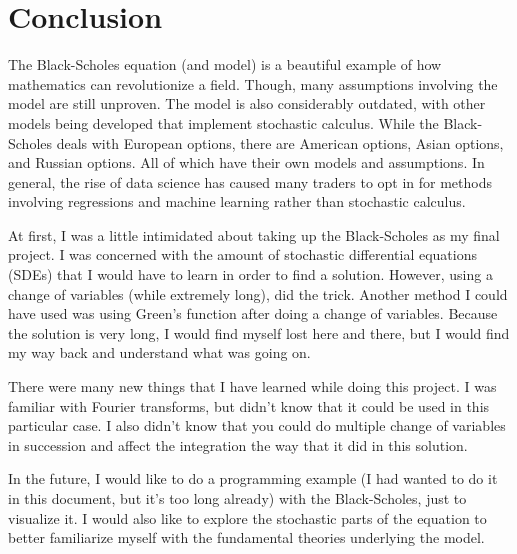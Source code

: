 \documentclass{article}
\begin{document}


\section*{Conclusion}

The Black-Scholes equation (and model) is a beautiful example of how mathematics can revolutionize a field. 
Though, many assumptions involving the model are still unproven. The model is also considerably outdated, with other models being developed that implement stochastic calculus. While the Black-Scholes deals with European options, there are American options, Asian options, and Russian options. All of which have their own models and assumptions. In general, the rise of data science has caused many traders to opt in for methods involving regressions and machine learning rather than stochastic calculus.

At first, I was a little intimidated about taking up the Black-Scholes as my final project. I was concerned with the amount of stochastic differential equations (SDEs) that I would have to learn in order to find a solution. However, using a change of variables (while extremely long), did the trick. Another method I could have used was using Green's function after doing a change of variables. \cite{dennis_silverman_solution_1999} Because the solution is very long, I would find myself lost here and there, but I would find my way back and understand what was going on. 

There were many new things that I have learned while doing this project. I was familiar with Fourier transforms, but didn't know that it could be used in this particular case. I also didn't know that you could do multiple change of variables in succession and affect the integration the way that it did in this solution.

In the future, I would like to do a programming example (I had wanted to do it in this document, but it's too long already) with the Black-Scholes, just to visualize it. I would also like to explore the stochastic parts of the equation to better familiarize myself with the fundamental theories underlying the model.
\end{document}
